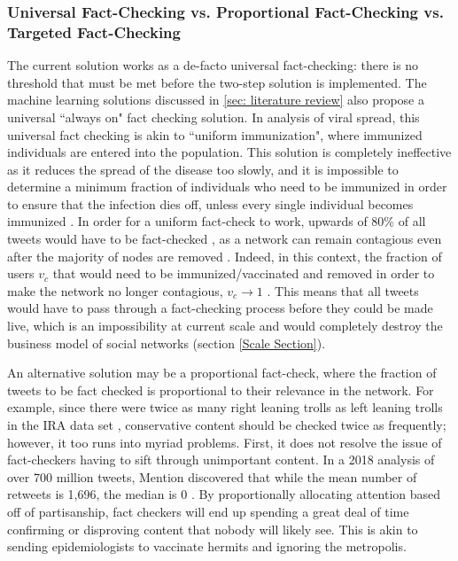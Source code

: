 \documentclass[preprint,review,12pt]{elsarticle}
\begin{document}
 \subsubsection{Universal Fact-Checking vs. Proportional Fact-Checking vs. Targeted Fact-Checking}
 The current solution works as a de-facto universal fact-checking: there is no threshold that must be met before the two-step solution is implemented. The machine learning solutions discussed in \ref{sec: literature review} also propose a universal ``always on" fact checking solution. In analysis of viral spread, this universal fact checking is akin to ``uniform immunization", where immunized individuals are entered into the population. This solution is completely ineffective as it reduces the spread of the disease too slowly, and it is impossible to determine a minimum fraction of individuals who need to be immunized in order to ensure that the infection dies off, unless every single individual becomes immunized \cite{pastor2002epidemic,pastor2002immunization,anderson1992infectious}. In order for a uniform fact-check to work, upwards of 80\% of all tweets would have to be fact-checked \cite{may1984spatial,hethcote2014gonorrhea,hethcote2013modeling,hethcote1987epidemiological,albert2000error, pastor2001epidemic}, as a network can remain contagious even after the majority of nodes are removed \cite{cohen2000resilience}. Indeed, in this context, the fraction of users $v_c$ that would need to be immunized/vaccinated and removed in order to make the network no longer contagious, $v_c \rightarrow 1$ \cite{cohen2003efficient,strogatz2001exploring,albert2002statistical,dorogovtsev2002evolution,pastor2002immunization}.
 This means that all tweets would have to pass through a fact-checking process before they could be made live, which is an impossibility at current scale and would completely destroy the business model of social networks (section \ref{Scale Section}).
 
 An alternative solution may be a proportional fact-check, where the fraction of tweets to be fact checked is proportional to their relevance in the network. For example, since there were twice as many right leaning trolls as left leaning trolls in the IRA data set \cite{freelon2020black,badawy2018analyzing,benkler2018network}, conservative content should be checked twice as frequently; however, it too runs into myriad problems. First, it does not resolve the issue of fact-checkers having to sift through unimportant content. In a 2018 analysis of over 700 million tweets, Mention discovered that while the mean number of retweets is 1,696, the median is 0 \citep{mention2018twitter}. By proportionally allocating attention based off of partisanship, fact checkers will end up spending a great deal of time confirming or disproving content that nobody will likely see. This is akin to sending epidemiologists to vaccinate hermits and ignoring the metropolis. 
\end{document}
